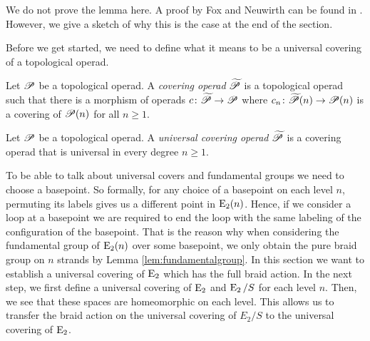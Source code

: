We do not prove the
lemma here. A proof by Fox and Neuwirth can be found in \cite{fox}. However, we
give a sketch of why this is the case at the end of the section.

Before we get started, we need to define what it means to be a universal
covering of a topological operad.

\begin{defin}
    Let $\P$  be a topological operad. A \emph{covering operad} $\widetilde{\P}$ is a
    topological operad such that there is a morphism of operads $c \colon
    \widetilde{\P} \to \P$ where $c_n \colon \widetilde{\P}(n) \to \P(n)$ is a
    covering of $\P(n)$ for all $n \geq 1$.
\end{defin}

\begin{defin}
    Let $\P$ be a topological operad. A \emph{universal covering operad}
    $\widetilde{\P}$ is a covering operad that is universal in every degree $n
    \geq 1$.
\end{defin}

To be able to talk about universal covers and fundamental groups
we need to choose a basepoint. So formally, for any choice of a basepoint on
each level $n$, permuting its labels gives us a different point in
$\E_2(n)$. Hence, if we consider a loop at a basepoint we are required to end
the loop with the same labeling of the configuration of the basepoint.
That is the reason why when considering the fundamental group of $\E_2(n)$ over some basepoint, we
only obtain the pure braid group on $n$ strands by Lemma
\ref{lem:fundamentalgroup}. 
In this section we want to establish a universal
covering of $\E_2$ which has the full braid action. 
In the next step, we first define a universal covering of $\E_2$ and $\E_2 \slash S$ for each level $n$.
Then, we see that these spaces are homeomorphic on each level. This allows us to transfer the braid action on
the universal covering of $E_2 \slash S$ to the universal covering of
$\E_2$.

